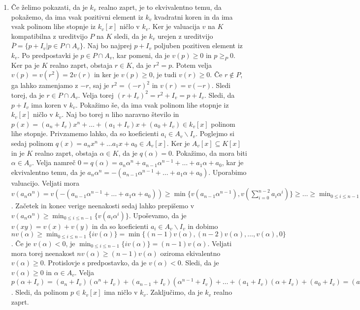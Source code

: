 \documentclass[a4paper, 12pt]{article}
\begin{document}
\begin{enumerate}
\item[(a)] Če želimo pokazati, da je $k_v$ realno zaprt, je to ekvivalentno temu, da pokažemo, da ima vsak pozitivni element iz $k_v$ kvadratni koren in da ima vsak polinom lihe stopnje iz $k_v[x]$ ničlo v $k_v$. Ker je valuacija $v$ na $K$ kompatibilna z ureditvijo $P$ na $K$ sledi, da je $k_v$ urejen z ureditvijo $\overline{P} = \{p+I_v| p \in P\cap A_v\}$. Naj bo najprej $p+I_v$ poljuben pozitiven element iz $k_v$. Po predpostavki je $p\in P \cap A_v$, kar pomeni, da je $v(p) \ge 0$ in $p\ge_P 0$. Ker pa je $K$ realno zaprt, obstaja $r\in K$, da je $r^2 = p$. Potem velja $v(p) = v(r^2) = 2v(r)$ in ker je $v(p)  \ge 0$, je tudi $v(r) \ge 0$. Če $r\notin P$, ga lahko zamenjamo z $-r$, saj je $r^2 = (-r)^2$ in $v(r) = v(-r)$. Sledi torej, da je $r\in P\cap A_v$. Velja torej $(r+I_v)^2 = r^2 + I_v = p+I_v$. Sledi, da $p + I_v$ ima koren v $k_v$. Pokažimo še, da ima vsak polinom lihe stopnje iz $k_v[x]$ ničlo v $k_v$. Naj bo torej $n$ liho naravno število in $p(x) = (a_n + I_v) x^n + \dots + (a_1 + I_v) x + (a_0 + I_v) \in k_v[x]$ polinom lihe stopnje. Privzamemo lahko, da so koeficienti $a_i \in A_v \smallsetminus I_v$. Poglejmo si sedaj polinom $q(x) = a_n x^n + \dots a_1 x +a_0 \in A_v[x]$. Ker je $A_v[x] \subseteq K[x]$ in je $K$ realno zaprt, obstaja $\alpha \in K$, da je $q(\alpha) = 0$. Pokažimo, da mora biti $\alpha \in A_v$. Velja namreč $0 = q(\alpha) = a_n \alpha^n + a_{n-1} \alpha^{n-1} + \dots + a_1 \alpha + a_0$, kar je ekvivalentno temu, da je $a_n \alpha^n = -(a_{n-1}\alpha^{n-1} + \dots + a_1 \alpha + a_0)$. Uporabimo valuacijo. Veljati mora 
$v(a_n \alpha^n) = v( -(a_{n-1}\alpha^{n-1} + \dots + a_1 \alpha + a_0))\ge \min\{v(a_{n-1}\alpha^{n-1}), v(\sum_{i=0}^{n-2} a_i \alpha^i)\} \ge \dots \ge \min_{0\le i \le n-1} \{v(a_i \alpha^i)\}$. Začetek in konec verige neenakosti sedaj lahko prepišemo v $v(a_n \alpha^{n}) \ge \min_{0\le i \le n-1} \{v(a_i \alpha^i)\}$. Upoševamo, da je $v(xy)= v(x) + v(y)$ in da so koeficienti $a_i \in A_v \smallsetminus I_v$ in dobimo $nv(\alpha) \ge \min_{0\le i \le n-1}\{iv(\alpha)\} = \min\{ (n-1)v(\alpha), (n-2)v(\alpha), \dots, v(\alpha), 0  \}$. Če je $v(\alpha) < 0$, je $\min_{0\le i \le n-1}\{iv(\alpha)\} = (n-1)v(\alpha)$. Veljati mora torej neenakost $nv(\alpha) \ge (n-1) v(\alpha)$ oziroma ekivalentno $v(\alpha) \ge 0$. Protislovje s predpostavko, da je $v(\alpha) <0$. Sledi, da je $v(\alpha) \ge 0$ in $\alpha \in A_v$. Velja $p(\alpha + I_v) = (a_n + I_v)(\alpha^n + I_v) + (a_{n-1} + I_v )(\alpha^{n-1} + I_v) + \dots + (a_1 + I_v) ( \alpha + I_v) + (a_0 + I_v) =(a_n \alpha^n + I_v) + (a_{n-1} \alpha^{n-1} + I_v) + \dots + (a_1 \alpha + I_v) + (a_0 + I_v) = q(\alpha) + I_v = 0 + I_v$. Sledi, da polinom $p\in k_v[x]$ ima ničlo v $k_v$. Zaključimo, da je $k_v$ realno zaprt.


\end{enumerate}
\end{document}
